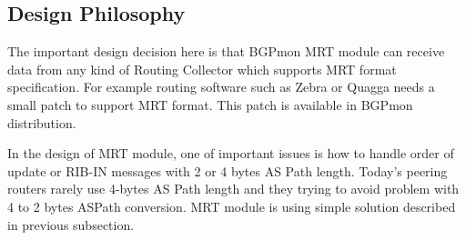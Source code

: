 \subsection{Design Philosophy}
The important design decision here is that BGPmon MRT module can receive data from any kind of Routing Collector which supports MRT format specification. For example routing software such as Zebra or Quagga needs a small patch to support MRT format. This patch is available in BGPmon distribution. 



In the design of MRT module, one of important issues is how to handle order of update or RIB-IN messages with 2 or 4 bytes AS Path length. Today's peering routers rarely use 4-bytes AS Path length and they trying to avoid problem with 4 to 2 bytes ASPath conversion. MRT module is using simple solution described in previous subsection.

